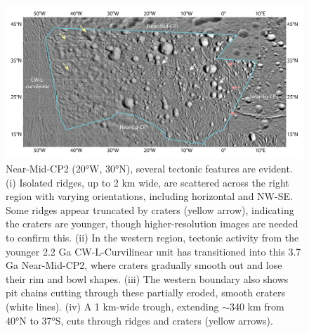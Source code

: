 \documentclass[preprint,12pt,3p,times,authoryear]{elsarticle}
\begin{document}
{\begin{figure}[t]
    \includegraphics[width=1.0\linewidth]{fig/FigS4B_Near-Mid-CP2.png}
    \caption{Near-Mid-CP2 (20°W, 30°N), several tectonic features are evident. (i) Isolated ridges, up to 2 km wide, are scattered across the right region with varying orientations, including horizontal and NW-SE. Some ridges appear truncated by craters (yellow arrow), indicating the craters are younger, though higher-resolution images are needed to confirm this. (ii) In the western region, tectonic activity from the younger 2.2 Ga CW-L-Curvilinear unit has transitioned into this 3.7 Ga Near-Mid-CP2, where craters gradually smooth out and lose their rim and bowl shapes. (iii) The western boundary also shows pit chains cutting through these partially eroded, smooth craters (white lines). (iv) A 1 km-wide trough, extending $\sim$340 km from 40°N to 37°S, cuts through ridges and craters (yellow arrows).}
    \label{fig:app_erosion2}
\end{figure}

}
\end{document}
